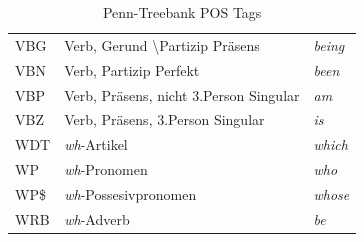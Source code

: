 \begin{table}
\begin{tabular}{ | l l l |}
	VBG & Verb, Gerund \textbackslash Partizip Präsens & \textit{being} \\
	VBN & Verb, Partizip Perfekt & \textit{been} \\
	VBP & Verb, Präsens, nicht 3.Person Singular & \textit{am}  \\
	VBZ & Verb, Präsens, 3.Person Singular & \textit{is} \\
	WDT & \textit{wh}-Artikel & \textit{which} \\
	WP & \textit{wh}-Pronomen & \textit{who} \\
	WP\$ & \textit{wh}-Possesivpronomen & \textit{whose} \\
	WRB & \textit{wh}-Adverb & \textit{be} \\
	\hline
\end{tabular}
\caption{Penn-Treebank POS Tags \cite{ptbInformationen}} 
\label{tab:pos-tags}
\end{table}

